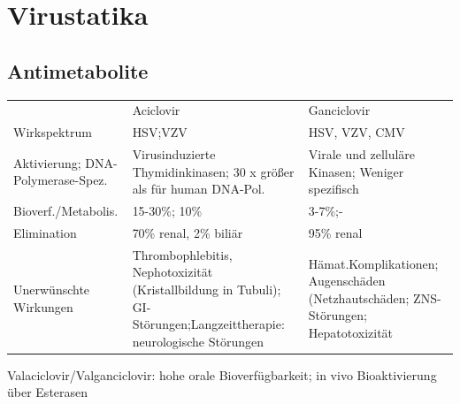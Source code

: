 \documentclass[10pt,a4paper]{report}
\begin{document}
\section{Virustatika} %
\label{sec:virustatika}
\subsection{Antimetabolite} %
\label{sub:antimetabolite}
\begin{tabularx}{\textwidth}{lXX}
&Aciclovir&Ganciclovir\\
Wirkspektrum&HSV;VZV&HSV, VZV, CMV\\
Aktivierung; DNA-Polymerase-Spez.&Virusinduzierte Thymidinkinasen; 30 x größer als für human DNA-Pol.&Virale und zelluläre Kinasen; Weniger spezifisch\\
Bioverf./Metabolis.&15-30\%; 10\%&3-7\%;-\\
Elimination&70\% renal, 2\% biliär&95\% renal\\
Unerwünschte Wirkungen&Thrombophlebitis, Nephotoxizität (Kristallbildung in Tubuli); GI-Störungen;Langzeittherapie: neurologische Störungen&Hämat.Komplikationen; Augenschäden (Netzhautschäden; ZNS-Störungen; Hepatotoxizität\\
\end{tabularx}
Valaciclovir/Valganciclovir: hohe orale Bioverfügbarkeit; in vivo Bioaktivierung über Esterasen
\end{document}
